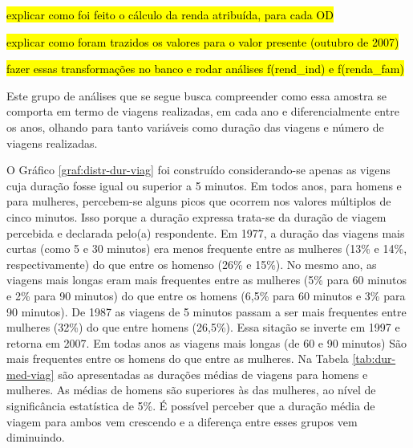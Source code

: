 \hl{explicar como foi feito o cálculo da renda atribuída, para cada OD}

\hl{explicar como foram trazidos os valores para o valor presente (outubro de 2007)}

\hl{fazer essas transformações no banco e rodar análises f(rend\_ind) e f(renda\_fam)}

\clearpage
Este grupo de análises que se segue busca compreender como essa amostra se comporta em termo de viagens realizadas, em cada ano e diferencialmente entre os anos, olhando para tanto variáveis como duração das viagens e número de viagens realizadas.


O Gráfico \ref{graf:distr-dur-viag} foi construído considerando-se apenas as vigens cuja duração fosse igual ou superior a 5 minutos. Em todos anos, para homens e para mulheres, percebem-se alguns picos que ocorrem nos valores múltiplos de cinco minutos. Isso porque a duração expressa trata-se da duração de viagem percebida e declarada pelo(a) respondente. Em 1977, a duração das viagens mais curtas (como 5 e 30 minutos) era menos frequente entre as mulheres (13\% e 14\%, respectivamente) do que entre os homenso (26\% e 15\%). No mesmo ano, as viagens mais longas eram mais frequentes entre as mulheres (5\% para 60 minutos e 2\% para 90 minutos) do que entre os homens (6,5\% para 60 minutos e 3\% para 90 minutos). De 1987 as viagens de 5 minutos passam a ser mais frequentes entre mulheres (32\%) do que entre homens (26,5\%). Essa sitação se inverte em 1997 e retorna em 2007.
Em todas anos as viagens mais longas (de 60 e 90 minutos) São mais frequentes entre os homens do que entre as mulheres.
Na Tabela \ref{tab:dur-med-viag} são apresentadas as durações médias de viagens para homens e mulheres. As médias de homens são superiores às das mulheres, ao nível de significância estatística de 5\%. É possível perceber que a duração média de viagem para ambos vem crescendo e a diferença entre esses grupos vem diminuindo.

